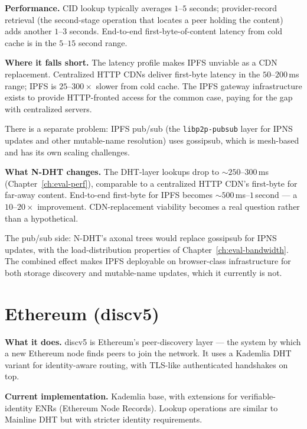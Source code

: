 \documentclass[twoside,nobib]{tufte-book}
\newcommand{\NDHT}{N-DHT\xspace}
\begin{document}
\textbf{Performance.} CID lookup typically averages $1$--$5$
seconds; provider-record retrieval (the second-stage operation
that locates a peer holding the content) adds another
$1$--$3$ seconds. End-to-end first-byte-of-content latency from
cold cache is in the $5$--$15$ second range.

\textbf{Where it falls short.} The latency profile makes IPFS
unviable as a CDN replacement. Centralized HTTP CDNs deliver
first-byte latency in the $50$--$200$\,ms range; IPFS is
$25$--$300\times$ slower from cold cache. The IPFS gateway
infrastructure exists to provide HTTP-fronted access for the
common case, paying for the gap with centralized servers.

There is a separate problem: IPFS pub/sub (the
\texttt{libp2p-pubsub} layer for IPNS updates and other
mutable-name resolution) uses gossipsub, which is mesh-based
and has its own scaling challenges.

\textbf{What \NDHT changes.} The DHT-layer lookups drop to
$\sim 250$--$300$\,ms (Chapter~\ref{ch:eval-perf}), comparable
to a centralized HTTP CDN's first-byte for far-away content.
End-to-end first-byte for IPFS becomes
$\sim 500$\,ms--$1$\,second --- a $10$--$20\times$
improvement. CDN-replacement viability becomes a real
question rather than a hypothetical.

The pub/sub side: \NDHT's axonal trees would replace gossipsub
for IPNS updates, with the load-distribution properties of
Chapter~\ref{ch:eval-bandwidth}. The combined effect makes
IPFS deployable on browser-class infrastructure for both
storage discovery and mutable-name updates, which it currently
is not.

\section{Ethereum (discv5)}

\textbf{What it does.} discv5 is Ethereum's peer-discovery
layer --- the system by which a new Ethereum node finds peers
to join the network. It uses a Kademlia DHT variant for
identity-aware routing, with TLS-like authenticated handshakes
on top.

\textbf{Current implementation.} Kademlia base, with extensions
for verifiable-identity ENRs (Ethereum Node Records). Lookup
operations are similar to Mainline DHT but with stricter
identity requirements.
\end{document}
